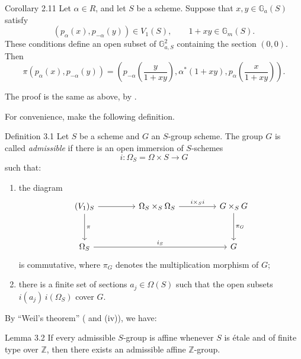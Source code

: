 \begin{sgastatement}{Corollary 2.11}
Let \(\alpha\in R\), and let \(S\) be a scheme. Suppose that
\(x,y\in\mathbb G_a(S)\) satisfy
\[
 (p_\alpha(x),p_{-\alpha}(y))\in V_1(S),
 \qquad 1+xy\in\mathbb G_m(S).
\]
These conditions define an open subset of \(\mathbb G_{a,S}^2\)
containing the section \((0,0)\). Then
\[
 \pi(p_\alpha(x),p_{-\alpha}(y))
 =
 \left(
 p_{-\alpha}\!\left(\frac{y}{1+xy}\right),
 \alpha^\ast(1+xy),
 p_\alpha\!\left(\frac{x}{1+xy}\right)
 \right).
\]
\end{sgastatement}

The proof is the same as above, by .


For convenience, make the following definition.

\begin{sgastatement}{Definition 3.1}
Let \(S\) be a scheme and \(G\) an \(S\)-group scheme. The group \(G\)
is called \emph{admissible} if there is an open immersion of
\(S\)-schemes
\[
 i\colon\Omega_S=\Omega\times S\longrightarrow G
\]
such that:
\begin{enumerate}[label=\textup{(\roman*)},leftmargin=2.2em]
\item the diagram
\[
\begin{tikzcd}[column sep=4.5em,row sep=3.2em]
(V_1)_S
  \arrow[r]
  \arrow[d,"\pi"]
&
\Omega_S\times_S\Omega_S
  \arrow[r,"i\times_S i"]
&
G\times_SG
  \arrow[d,"\pi_G"]
\\
\Omega_S
  \arrow[rr,"i_S"]
&&
G
\end{tikzcd}
\]
is commutative, where \(\pi_G\) denotes the multiplication morphism
of \(G\);
\item there is a finite set of sections \(a_j\in\Omega(S)\) such that
the open subsets \(i(a_j)\,i(\Omega_S)\) cover \(G\).
\end{enumerate}
\end{sgastatement}

By ``Weil's theorem'' ( and (iv)), we have:

\begin{sgastatement}{Lemma 3.2}
If every admissible \(S\)-group is affine whenever \(S\) is étale and
of finite type over \(\mathbb Z\), then there exists an admissible
affine \(\mathbb Z\)-group.
\end{sgastatement}

